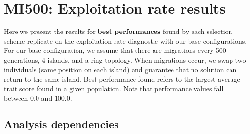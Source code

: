 \documentclass[]{book}
\newenvironment{Shaded}{\begin{snugshade}}{\end{snugshade}}
\newcommand{\CharTok}[1]{\textcolor[rgb]{0.31,0.60,0.02}{#1}}
\newcommand{\DataTypeTok}[1]{\textcolor[rgb]{0.13,0.29,0.53}{#1}}
\newcommand{\KeywordTok}[1]{\textcolor[rgb]{0.13,0.29,0.53}{\textbf{#1}}}
\newcommand{\NormalTok}[1]{#1}
\newcommand{\OperatorTok}[1]{\textcolor[rgb]{0.81,0.36,0.00}{\textbf{#1}}}
\newcommand{\StringTok}[1]{\textcolor[rgb]{0.31,0.60,0.02}{#1}}
\begin{document}
\begin{Shaded}
\end{Shaded}

\hypertarget{mi500-exploitation-rate-results}{%
\chapter{MI500: Exploitation rate results}\label{mi500-exploitation-rate-results}}

Here we present the results for \textbf{best performances} found by each selection scheme replicate on the exploitation rate diagnostic with our base configurations.
For our base configuration, we assume that there are migrations every 500 generations, 4 islands, and a ring topology.
When migrations occur, we swap two individuals (same position on each island) and guarantee that no solution can return to the same island.
Best performance found refers to the largest average trait score found in a given population.
Note that performance values fall between 0.0 and 100.0.

\hypertarget{analysis-dependencies}{%
\section{Analysis dependencies}\label{analysis-dependencies}}
\end{document}

